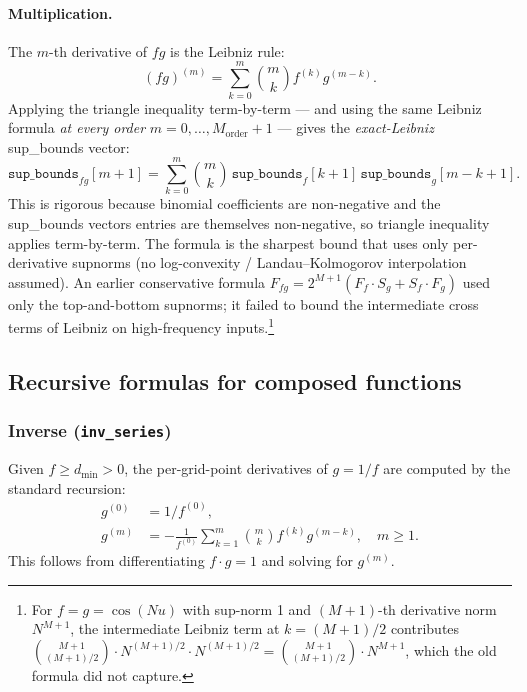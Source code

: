 \documentclass[11pt]{article}
\theoremstyle{definition}
\begin{document}
\paragraph{Multiplication.}
The $m$-th derivative of $fg$ is the Leibniz rule:
\[
  (fg)^{(m)} = \sum_{k=0}^{m} \binom{m}{k} f^{(k)} g^{(m-k)}.
\]
Applying the triangle inequality term-by-term — and using the same Leibniz
formula \emph{at every order} $m = 0,\ldots,M_{\mathrm{order}}+1$ — gives
the \emph{exact-Leibniz} sup\_bounds vector:
\begin{equation}\label{eq:product_fbound}
  \texttt{sup\_bounds}_{fg}[m{+}1]
    = \sum_{k=0}^{m} \binom{m}{k}\, \texttt{sup\_bounds}_f[k{+}1]\,
                                    \texttt{sup\_bounds}_g[m{-}k{+}1].
\end{equation}
This is rigorous because binomial coefficients are non-negative and the
sup\_bounds vectors entries are themselves non-negative, so triangle inequality
applies term-by-term. The formula is the sharpest bound that uses only
per-derivative supnorms (no log-convexity / Landau--Kolmogorov interpolation
assumed). An earlier conservative formula
$F_{fg} = 2^{M+1}(F_f \cdot S_g + S_f \cdot F_g)$ used only the top-and-bottom
supnorms; it failed to bound the intermediate cross terms of Leibniz on
high-frequency inputs.\footnote{For $f = g = \cos(Nu)$ with sup-norm 1 and
$(M{+}1)$-th derivative norm $N^{M+1}$, the intermediate Leibniz term at
$k = (M{+}1)/2$ contributes $\binom{M+1}{(M+1)/2} \cdot N^{(M+1)/2} \cdot N^{(M+1)/2}
= \binom{M+1}{(M+1)/2} \cdot N^{M+1}$, which the old formula did not capture.}

\subsection{Recursive formulas for composed functions}

\subsubsection{Inverse (\texttt{inv\_series})}

Given $f \ge d_{\min} > 0$, the per-grid-point derivatives of $g = 1/f$
are computed by the standard recursion:
\begin{align}
  g^{(0)} &= 1/f^{(0)}, \label{eq:inv0}\\
  g^{(m)} &= -\frac{1}{f^{(0)}} \sum_{k=1}^{m} \binom{m}{k} f^{(k)} g^{(m-k)},
             \quad m \ge 1. \label{eq:invm}
\end{align}
This follows from differentiating $f \cdot g = 1$ and solving for $g^{(m)}$.
\end{document}
